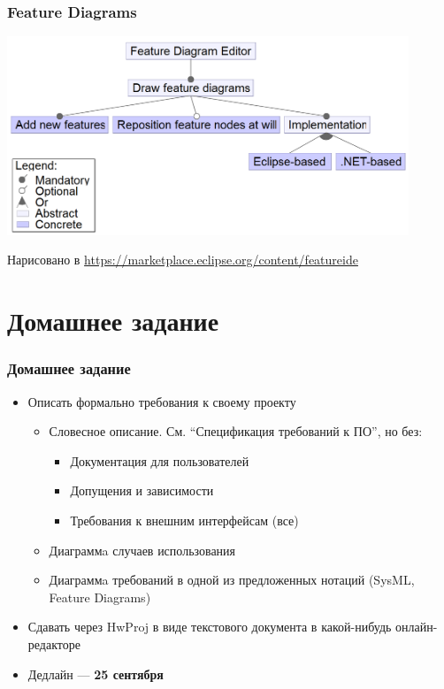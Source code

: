 \documentclass[xetex,mathserif,serif]{beamer}
\begin{document}
	\begin{frame}
		\frametitle{Feature Diagrams}
		\begin{center}
			\includegraphics[width=0.9\textwidth]{featureDiagram.png}
		\end{center}
		\begin{footnotesize}
			Нарисовано в \url{https://marketplace.eclipse.org/content/featureide}
		\end{footnotesize}
	\end{frame}

	\section{Домашнее задание}

	\begin{frame}
		\frametitle{Домашнее задание}
		\begin{itemize}
			\item Описать формально требования к своему проекту
			\begin{itemize}
				\item Словесное описание. См. ``Спецификация требований к ПО'', но без:
				\begin{itemize}
					\item Документация для пользователей
					\item Допущения и зависимости
					\item Требования к внешним интерфейсам (все)
				\end{itemize}
				\item Диаграммa случаев использования
				\item Диаграммa требований в одной из предложенных нотаций (SysML, Feature Diagrams)
			\end{itemize}
			\item Сдавать через HwProj в виде текстового документа в какой-нибудь онлайн-редакторе
			\item Дедлайн --- \textbf{25 сентября}
		\end{itemize}
	\end{frame}
\end{document}

